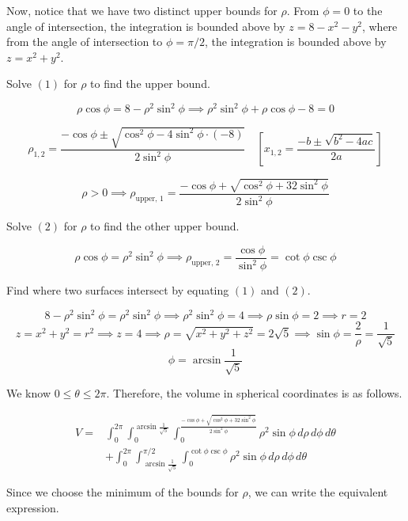 \documentclass{article}
\begin{document}
\hfill

\noindent Now, notice that we have two distinct upper bounds for $\rho$. From $\phi=0$ to the angle of intersection, the integration is bounded above by $z=8-x^2-y^2$, where from the angle of intersection to $\phi=\pi/2$, the integration is bounded above by $z=x^2+y^2$.

\hfill

\noindent Solve $(1)$ for $\rho$ to find the upper bound.

\[\rho\cos\phi=8-\rho^2\sin^2\phi\implies\rho^2\sin^2\phi+\rho\cos\phi-8=0\]

\[\rho_{1,2}=\frac{-\cos\phi\pm\sqrt{\cos^2\phi-4\sin^2\phi\cdot(-8)}}{2\sin^2\phi}\quad\left[x_{1,2}=\frac{-b\pm\sqrt{b^2-4ac}}{2a}\right]\]

\[\rho>0\implies \rho_{\text{upper, 1}}=\frac{-\cos\phi+\sqrt{\cos^2\phi+32\sin^2\phi}}{2\sin^2\phi}\]

\hfill

\noindent Solve $(2)$ for $\rho$ to find the other upper bound.

\[\rho\cos\phi=\rho^2\sin^2\phi\implies\rho_{\text{upper, 2}}=\frac{\cos\phi}{\sin^2\phi}=\cot\phi\csc\phi\]

\hfill

\noindent Find where two surfaces intersect by equating $(1)$ and $(2)$.

\[8-\rho^2\sin^2\phi=\rho^2\sin^2\phi\implies \rho^2\sin^2\phi=4\implies \rho\sin\phi=2\implies r=2\]
\[z=x^2+y^2=r^2\implies z=4\implies \rho=\sqrt{x^2+y^2+z^2}=2\sqrt5\implies \sin\phi=\frac2\rho=\frac1{\sqrt{5}}\]
\[\phi=\arcsin\frac1{\sqrt5}\]

\hfill

\noindent We know $0\leq\theta\leq2\pi$. Therefore, the volume in spherical coordinates is as follows.

\begin{equation*}
\boxed{\begin{array}{ll}
V=&\displaystyle\int_0^{2\pi}\int_0^{\arcsin\textstyle\frac1{\sqrt5}}\int_0^{\textstyle\frac{-\cos\phi+\sqrt{\cos^2\phi+32\sin^2\phi}}{2\sin^2\phi}}\rho^2\sin\phi\,d\rho\,d\phi\,d\theta\\[1em]
&\displaystyle+\int_0^{2\pi}\int_{\arcsin\textstyle\frac1{\sqrt5}}^{\pi/2}\int_0^{\cot\phi\csc\phi}\rho^2\sin\phi\,d\rho\,d\phi\,d\theta
\end{array}}
\end{equation*}

\hfill

\noindent Since we choose the minimum of the bounds for $\rho$, we can write the equivalent expression.
\end{document}
